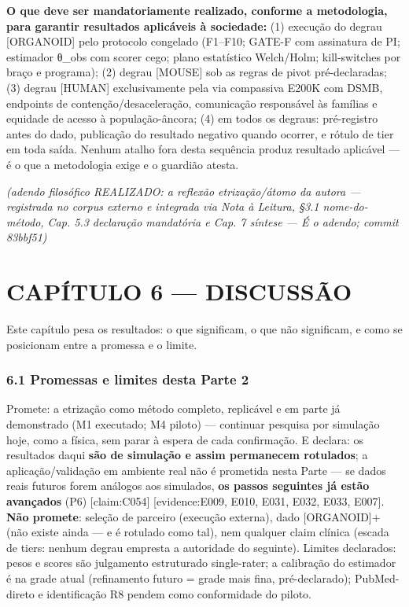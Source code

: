\documentclass[
  12pt,
]{report}
\begin{document}
\textbf{O que deve ser mandatoriamente realizado, conforme a
metodologia, para garantir resultados aplicáveis à sociedade:} (1)
execução do degrau {[}ORGANOID{]} pelo protocolo congelado (F1--F10;
GATE-F com assinatura de PI; estimador θ\_obs com scorer cego; plano
estatístico Welch/Holm; kill-switches por braço e programa); (2) degrau
{[}MOUSE{]} sob as regras de pivot pré-declaradas; (3) degrau
{[}HUMAN{]} exclusivamente pela via compassiva E200K com DSMB, endpoints
de contenção/desaceleração, comunicação responsável às famílias e
equidade de acesso à população-âncora; (4) em todos os degraus:
pré-registro antes do dado, publicação do resultado negativo quando
ocorrer, e rótulo de tier em toda saída. Nenhum atalho fora desta
sequência produz resultado aplicável --- é o que a metodologia exige e o
guardião atesta.

\emph{(adendo filosófico REALIZADO: a reflexão etrização/átomo da autora
--- registrada no corpus externo e integrada via Nota à Leitura, §3.1
nome-do-método, Cap. 5.3 declaração mandatória e Cap. 7 síntese --- É o
adendo; commit 83bbf51)}

\hypertarget{capuxedtulo-6-discussuxe3o}{%
\chapter{CAPÍTULO 6 --- DISCUSSÃO}\label{capuxedtulo-6-discussuxe3o}}

Este capítulo pesa os resultados: o que significam, o que não
significam, e como se posicionam entre a promessa e o limite.

\hypertarget{promessas-e-limites-desta-parte-2}{%
\subsection{6.1 Promessas e limites desta Parte
2}\label{promessas-e-limites-desta-parte-2}}

Promete: a etrização como método completo, replicável e em parte já
demonstrado (M1 executado; M4 piloto) --- continuar pesquisa por
simulação hoje, como a física, sem parar à espera de cada confirmação. E
declara: os resultados daqui \textbf{são de simulação e assim permanecem
rotulados}; a aplicação/validação em ambiente real não é prometida nesta
Parte --- se dados reais futuros forem análogos aos simulados,
\textbf{os passos seguintes já estão avançados} (P6) {[}claim:C054{]}
{[}evidence:E009, E010, E031, E032, E033, E007{]}. \textbf{Não promete}:
seleção de parceiro (execução externa), dado {[}ORGANOID{]}+ (não existe
ainda --- e é rotulado como tal), nem qualquer claim clínica (escada de
tiers: nenhum degrau empresta a autoridade do seguinte). Limites
declarados: pesos e scores são julgamento estruturado single-rater; a
calibração do estimador é na grade atual (refinamento futuro = grade
mais fina, pré-declarado); PubMed-direto e identificação R8 pendem como
conformidade do piloto.
\end{document}
